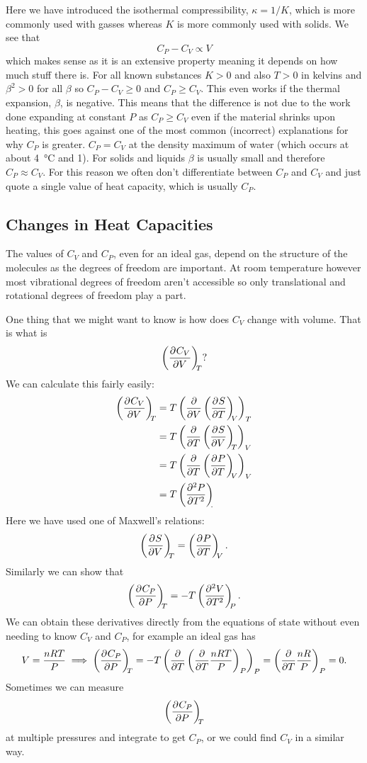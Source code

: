     Here we have introduced the isothermal compressibility, \(\kappa = 1/K\), which is more commonly used with gasses whereas \(K\) is more commonly used with solids.
    We see that
    \[C_P - C_V \propto V\]
    which makes sense as it is an extensive property meaning it depends on how much stuff there is.
    For all known substances \(K > 0\) and also \(T > 0\) in kelvins and \(\beta^2 > 0\) for all \(\beta\) so \(C_P - C_V \ge 0\) and \(C_P \ge C_V\).
    This even works if the thermal expansion, \(\beta\), is negative.
    This means that the difference is not due to the work done expanding at constant \(P\) as \(C_P \ge C_V\) even if the material shrinks upon heating, this goes against one of the most common (incorrect) explanations for why \(C_P\) is greater.
    \(C_P = C_V\) at the density maximum of water (which occurs at about \SI{4}{\degreeCelsius} and \SI{1}{\atm}).
    For solids and liquids \(\beta\) is usually small and therefore \(C_P \approx C_V\).
    For this reason we often don't differentiate between \(C_P\) and \(C_V\) and just quote a single value of heat capacity, which is usually \(C_P\).
    
    \subsection{Changes in Heat Capacities}\label{sec:changes in heat capacities}
    The values of \(C_V\) and \(C_P\), even for an ideal gas, depend on the structure of the molecules as the degrees of freedom are important.
    At room temperature however most vibrational degrees of freedom aren't accessible so only translational and rotational degrees of freedom play a part.
    
    One thing that we might want to know is how does \(C_V\) change with volume.
    That is what is
    \[\left(\pdv[]{C_V}{V}\right)_{\!\!{T}}?\]
    We can calculate this fairly easily:
    \begin{align*}
        \pdvconst{C_V}{V}{T} &= T\left(\pdv{V}\pdvconst{S}{T}{V}\right)_T\\
        &= T\left(\pdv{T}\pdvconst{S}{V}{T}\right)_V\\
        &= T\left(\pdv{T}\pdvconst{P}{T}{V}\right)_V\\
        &= T\pdvconst[2]{P}{T}.
    \end{align*}
    Here we have used one of Maxwell's relations:
    \[\left(\pdv[]{S}{V}\right)_{\!\!{T}} = \left(\pdv[]{P}{T}\right)_{\!\!{V}}.\]
    Similarly we can show that
    \[\left(\pdv[]{C_P}{P}\right)_{\!\!{T}} = -T\left(\pdv[2]{V}{T}\right)_{\!\!{P}}.\]
    We can obtain these derivatives directly from the equations of state without even needing to know \(C_V\) and \(C_P\), for example an ideal gas has
    \[V = \frac{nRT}{P} \implies \left(\pdv[]{C_P}{P}\right)_{\!\!{T}} = -T\left(\pdv{T}\left(\pdv{T}\frac{nRT}{P}\right)_P\right)_P = \left(\pdv{T}\frac{nR}{P}\right)_P = 0.\]
    Sometimes we can measure
    \[\left(\pdv[]{C_P}{P}\right)_{\!\!{T}}\]
    at multiple pressures and integrate to get \(C_P\), or we could find \(C_V\) in a similar way.
    
